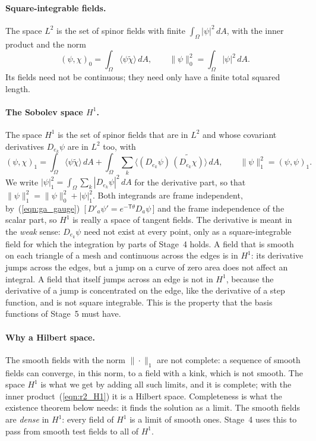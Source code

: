 \paragraph{Square-integrable fields.} The space $L^2$ is the set of spinor fields with finite $\int_\Omega |\psi|^2\, dA$, with the inner product and the norm
\begin{equation*}
(\psi, \chi)_0 = \int_\Omega \langle\psi\widetilde\chi\rangle\, dA, \qquad \|\psi\|_0^2 = \int_\Omega |\psi|^2\, dA .
\end{equation*}
Its fields need not be continuous; they need only have a finite total squared length.

\paragraph{The Sobolev space $H^1$.} The space $H^1$ is the set of spinor fields that are in $L^2$ and whose covariant derivatives $D_{e_k}\psi$ are in $L^2$ too, with
\begin{equation}
\label{eqn:r2_H1}
(\psi, \chi)_1 = \int_\Omega \langle\psi\widetilde\chi\rangle\, dA + \int_\Omega \sum_k \big\langle (D_{e_k}\psi)\,\widetilde{(D_{e_k}\chi)}\big\rangle\, dA, \qquad \|\psi\|_1^2 = (\psi, \psi)_1 .
\end{equation}
We write $|\psi|_1^2 = \int_\Omega\sum_k|D_{e_k}\psi|^2\, dA$ for the derivative part, so that $\|\psi\|_1^2 = \|\psi\|_0^2 + |\psi|_1^2$. Both integrands are frame independent, by~(\ref{eqn:ga_gauge})~[\,$D'_a\psi' = e^{-\mathsf T\theta}D_a\psi$\,] and the frame independence of the scalar part, so $H^1$ is really a space of tangent fields. The derivative is meant in the \emph{weak} sense: $D_{e_k}\psi$ need not exist at every point, only as a square-integrable field for which the integration by parts of Stage~4 holds. A field that is smooth on each triangle of a mesh and continuous across the edges is in $H^1$: its derivative jumps across the edges, but a jump on a curve of zero area does not affect an integral. A field that itself jumps across an edge is not in $H^1$, because the derivative of a jump is concentrated on the edge, like the derivative of a step function, and is not square integrable. This is the property that the basis functions of Stage~5 must have.

\paragraph{Why a Hilbert space.} The smooth fields with the norm $\|\cdot\|_1$ are not complete: a sequence of smooth fields can converge, in this norm, to a field with a kink, which is not smooth. The space $H^1$ is what we get by adding all such limits, and it is complete; with the inner product~(\ref{eqn:r2_H1}) it is a Hilbert space. Completeness is what the existence theorem below needs: it finds the solution as a limit. The smooth fields are \emph{dense} in $H^1$: every field of $H^1$ is a limit of smooth ones. Stage~4 uses this to pass from smooth test fields to all of $H^1$.


